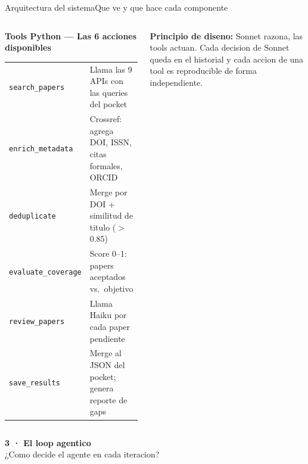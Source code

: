 \documentclass[aspectratio=169,10pt]{beamer}
\newenvironment{card}[1][cardbg]{%
  \begin{tcolorbox}[colback=#1,colframe=bidlight!40,arc=4pt,
    boxrule=0.4pt,left=5pt,right=5pt,top=4pt,bottom=4pt]}%
  {\end{tcolorbox}}
\begin{document}
\begin{frame}{Arquitectura del sistema}{Que ve y que hace cada componente}
\begin{columns}[T]
\begin{card}
\scriptsize\textbf{\color{bidaccent}Tools Python — Las 6 acciones disponibles}\\[3pt]
\tiny\color{bidgray}
\setlength\tabcolsep{3pt}
\renewcommand{\arraystretch}{1.25}
\begin{tabular}{@{}p{23mm}p{34mm}@{}}
\texttt{search\_papers}     & Llama las 9 APIs con las queries del pocket \\
\texttt{enrich\_metadata}   & Crossref: agrega DOI, ISSN, citas formales, ORCID \\
\texttt{deduplicate}        & Merge por DOI + similitud de titulo ($>$0.85) \\
\texttt{evaluate\_coverage} & Score 0--1: papers aceptados vs.\ objetivo \\
\texttt{review\_papers}     & Llama Haiku por cada paper pendiente \\
\texttt{save\_results}      & Merge al JSON del pocket; genera reporte de gaps \\
\end{tabular}
\end{card}

\vspace{3pt}
\begin{card}
\tiny\color{bidgray}
\textbf{\color{bidaccent}Principio de diseno:} Sonnet razona, las tools actuan. Cada decision de Sonnet queda en el historial y cada accion de una tool es reproducible de forma independiente.
\end{card}

\end{columns}
\end{frame}

{
\begin{frame}[plain]\vspace{20mm}
\begin{center}
{\Large\bfseries\color{bidaccent}3 · El loop agentico}\\[5pt]
{\color{bidgray}\normalsize ¿Como decide el agente en cada iteracion?}
\end{center}
\end{frame}
}
\end{document}

